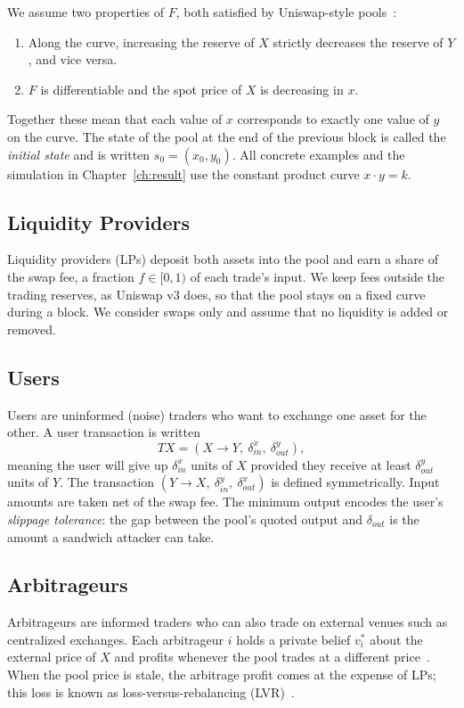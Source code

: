 We assume two properties of $F$, both satisfied by Uniswap-style pools~\cite{adams2020uniswap}:
\begin{enumerate}
    \item Along the curve, increasing the reserve of $X$ strictly decreases the reserve of $Y$, and vice versa.
    \item $F$ is differentiable and the spot price of $X$ is decreasing in $x$.
\end{enumerate}
Together these mean that each value of $x$ corresponds to exactly one value of $y$ on the curve. The state of the pool at the end of the previous block is called the \emph{initial state} and is written $s_0=(x_0,y_0)$. All concrete examples and the simulation in Chapter~\ref{ch:result} use the constant product curve $x\cdot y=k$.

\subsection{Liquidity Providers}

Liquidity providers (LPs) deposit both assets into the pool and earn a share of the swap fee, a fraction $f\in[0,1)$ of each trade's input. We keep fees outside the trading reserves, as Uniswap v3 does, so that the pool stays on a fixed curve during a block. We consider swaps only and assume that no liquidity is added or removed.

\subsection{Users}

Users are uninformed (noise) traders who want to exchange one asset for the other. A user transaction is written
\[
TX=(X\rightarrow Y,\ \delta^{x}_{in},\ \delta^{y}_{out}),
\]
meaning the user will give up $\delta^{x}_{in}$ units of $X$ provided they receive at least $\delta^{y}_{out}$ units of $Y$. The transaction $(Y\rightarrow X,\ \delta^{y}_{in},\ \delta^{x}_{out})$ is defined symmetrically. Input amounts are taken net of the swap fee. The minimum output encodes the user's \emph{slippage tolerance}: the gap between the pool's quoted output and $\delta_{out}$ is the amount a sandwich attacker can take.

\subsection{Arbitrageurs}

Arbitrageurs are informed traders who can also trade on external venues such as centralized exchanges. Each arbitrageur $i$ holds a private belief $v_i^{*}$ about the external price of $X$ and profits whenever the pool trades at a different price~\cite{yang2022sok}. When the pool price is stale, the arbitrage profit comes at the expense of LPs; this loss is known as loss-versus-rebalancing (LVR)~\cite{milionis2022lvr}.

